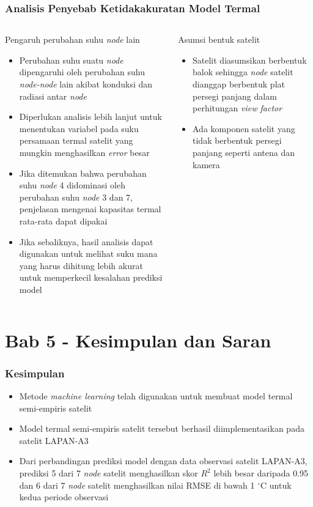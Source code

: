 \documentclass[8pt]{beamer}
\begin{document}
\begin{frame}
  \frametitle{Analisis Penyebab Ketidakakuratan Model Termal}
  \begin{columns}[T]
    \begin{block}{\center Pengaruh perubahan suhu \textit{node} lain}
      \begin{itemize}
        \item Perubahan suhu suatu \textit{node} dipengaruhi oleh perubahan suhu \textit{node-node} lain akibat konduksi dan radiasi antar \textit{node}
        \item Diperlukan analisis lebih lanjut untuk menentukan variabel pada suku persamaan termal satelit yang mungkin menghasilkan \textit{error} besar 
        \item Jika ditemukan bahwa perubahan suhu \textit{node} 4 didominasi oleh perubahan suhu \textit{node} 3 dan 7, penjelasan mengenai kapasitas termal rata-rata dapat dipakai
        \item Jika sebaliknya, hasil analisis dapat digunakan untuk melihat suku mana yang harus dihitung lebih akurat untuk memperkecil kesalahan prediksi model
      \end{itemize}
    \end{block}
    \begin{block}{\center Asumsi bentuk satelit}
      \begin{itemize}
        \item Satelit diasumsikan berbentuk balok sehingga \textit{node} satelit dianggap berbentuk plat persegi panjang dalam perhitungan \textit{view factor}
        \item Ada komponen satelit yang tidak berbentuk persegi panjang seperti antena dan kamera
      \end{itemize}
    \end{block}
  \end{columns}
\end{frame}

\section{Bab 5 - Kesimpulan dan Saran}
\begin{frame}
  \frametitle{Kesimpulan}
  \begin{itemize}
    \item Metode \textit{machine learning} telah digunakan untuk membuat model termal semi-empiris satelit
    \item Model termal semi-empiris satelit tersebut berhasil diimplementasikan pada satelit LAPAN-A3
    \item Dari perbandingan prediksi model dengan data observasi satelit LAPAN-A3, prediksi 5 dari 7 \textit{node} satelit menghasilkan skor $R^2$ lebih besar daripada 0.95 dan 6 dari 7 \textit{node} satelit menghasilkan nilai RMSE di bawah 1 $^\circ$C untuk kedua periode observasi
  \end{itemize}
\end{frame}
\end{document}
